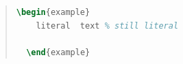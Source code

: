 \begin{quote}
  \begin{lstlisting}[language=TeX,frame=single]
\begin{example}
    literal  text % still literal

  \end{example}
\end{lstlisting} %
\end{quote}
